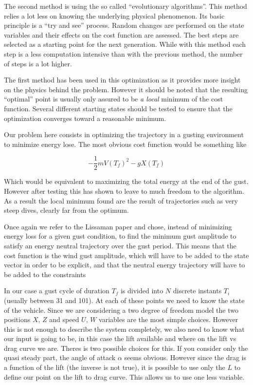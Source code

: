 \par The second method is using the so called ``evolutionary algorithms''. 
This method relies a lot less on knowing the underlying physical phenomenon.
Its basic principle is a ``try and see'' process.
Random changes are performed on the state variables and their effects on the cost function are assessed.
The best steps are selected as a starting point for the next generation.
While with this method each step is a less computation intensive than with the previous method, the number of steps is a lot higher.

\par The first method has been used in this optimization as it provides more insight on the physics behind the problem.
However it should be noted that the resulting ``optimal'' point is usually only assured to be \emph{a local} minimum of the cost function.
Several different starting states should be tested to ensure that the optimization converges toward a reasonable minimum.



Our problem here consists in optimizing the trajectory in a gusting environment to minimize energy lose.
The most obvious cost function would be something like

\begin{equation}
  - \frac{1}{2}m{V(T_f)}^2 - gX(T_f)
  \label{eqn:eni_cost_fun}
\end{equation}

Which would be equivalent to maximizing the total energy at the end of the gust.
However after testing this has shown to leave to much freedom to the algorithm. 
As a result the local minimum found are the result of trajectories such as very steep dives, clearly far from the optimum.

\par Once again we refer to the Lissaman paper \cite{Lissaman2007neutral} and chose, instead of minimizing energy loss for a given gust condition, to find the minimum gust amplitude to satisfy an energy neutral trajectory over the gust period.
This means that the cost function is the wind gust amplitude, which will have to be added to the state vector in order to be explicit, and that the neutral energy trajectory will have to be added to the constraints

In our case a gust cycle of duration $T_f$ is divided into $N$ discrete instants $T_i$ (usually between 31 and 101).
At each of these points we need to know the state of the vehicle.
Since we are considering a two degree of freedom model the two positions $X$, $Z$ and speed $U$, $W$ variables are the most simple choices.
However this is not enough to describe the system completely, we also need to know what our input is going to be, in this case the lift available and where on the lift vs drag curve we are.
Theres is two possible choices for this.
If you consider only the quasi steady part, the angle of attack $\alpha$ seems obvious.
However since the drag is a function of the lift (the inverse is not true), it is possible to use only the $L$ to define our point on the lift to drag curve.
This allows us to use one less variable.

